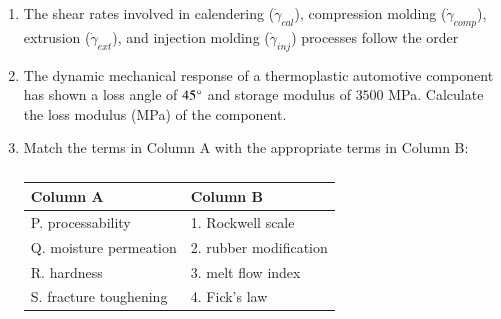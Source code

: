 \documentclass[a4paper,10pt]{article}
\begin{document}
\begin{enumerate}[label=\Alph*)]
    \item The shear rates involved in calendering ($\dot{\gamma}_{cal}$), compression molding ($\dot{\gamma}_{comp}$), extrusion ($\dot{\gamma}_{ext}$), and injection molding ($\dot{\gamma}_{inj}$) processes follow the order
    
    \hfill{}
    \begin{enumerate}[label=\Alph*)]
    \end{enumerate}

    \item The dynamic mechanical response of a thermoplastic automotive component has shown a loss angle of $45\degree$ and storage modulus of $3500$ MPa. Calculate the loss modulus (MPa) of the component.
    
    \hfill{}
    
    \item Match the terms in Column A with the appropriate terms in Column B:
    \begin{table}[h!] \centering \caption*{} \label{tab:q17_polymer}
        \begin{tabular}{ll} \hline
            \textbf{Column A} & \textbf{Column B} \\ \hline
            P. processability & 1. Rockwell scale \\
            Q. moisture permeation & 2. rubber modification \\
            R. hardness & 3. melt flow index \\
            S. fracture toughening & 4. Fick's law \\ \hline
        \end{tabular}
    \end{table}
    
    \hfill{}
    \begin{enumerate}[label=\Alph*)]
    \end{enumerate}


\end{enumerate}
\end{document}
